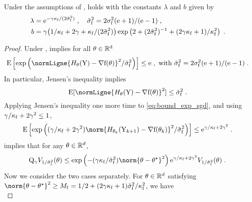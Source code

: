 \begin{lemma}
Under the assumptions of ,  holds with the constants $\lambda$ and $b$ given by 
\begin{equation}
\label{eq:ass_A1_PR_constants}
\begin{split}
\lambda &= \mathrm{e}^{-\gamma\kappa_{\mathrm{f}}/(2\tilde{\sigma}_{\mathrm{f}}^2)}\;, \quad \tilde{\sigma}_{\mathrm{f}}^2 = 2\sigma_{\mathrm{f}}^2(\mathrm{e}+1)/(\mathrm{e}-1)\;, \\
b &= \gamma\bigl(1/\kappa_{\mathrm{f}} + 2 \gamma + \kappa_{\mathrm{f}}/(2\tilde{\sigma}_{\mathrm{f}}^2)\bigr)\exp\left(2 + (2\tilde{\sigma}_{\mathrm{f}}^2)^{-1} + (2\gamma \kappa_{\mathrm{f}}+1)/\kappa_{\mathrm{f}}^2\right)\;.
\end{split}
\end{equation}
\end{lemma}
\begin{proof}
Under ,  implies for all $\theta \in \mathbb{R}^{\mathrm{d}}$
\begin{equation}
  \label{eq:bound_exp_sgd}
  \PE\parentheseDeux{\exp\parenthese{\normLigne{\fieldH_{\theta}(\YSGD) - \nabla \objf(\theta)}^2/\tsgvarfac}}
  \leq \rme \eqsp, \text{ with } \tsgvarfac = 2\sgvarfac(\rme+1)/(\rme-1) \eqsp.
\end{equation}
In particular, Jensen's inequality implies
  \begin{equation}
    \label{eq:bound_var_sgd}
    \PE[\normLigne{\fieldH_{\theta}(\YSGD) - \nabla \objf(\theta)}^2] \leq \tsgvarfac \eqsp.
  \end{equation}
Applying Jensen's inequality one more time to \eqref{eq:bound_exp_sgd}, and using $\gamma/\kappa_{\mathrm{f}} + 2\gamma^2 \leq 1$,
\begin{equation*}
\PE\left[\exp\parenthese{(\gamma / \kapf + 2 \gamma^2) \norm{\fieldH_{\theta_k}(\YSGD_{k+1}) - \nabla \objf(\theta_k)}^2/\tsgvarfac}\right] \leq \rme^{\gamma / \kapf + 2 \gamma^2} \eqsp.
\end{equation*}
 implies that for any $\theta \in \mathbb{R}^d$,
\begin{equation}
\label{eq:Q_gamma_image_bound}
\MKSGD_{\gamma} V_{1/\tsgvarfac}(\theta) \leq \exp\parenthese{-(\gamma \kapf/\tsgvarfac) \norm{\theta - \thetas}^2} \rme^{\gamma / \kapf + 2 \gamma^2} V_{1/\tsgvarfac}(\theta)   \eqsp.
\end{equation}
Now we consider the two cases separately. For $\theta \in\mathbb{R}^d$ satisfying $\norm{\theta-\thetas}^2 \geq M_{\objf} = 1/2 + (2\gamma \kapf+1)\tsgvarfac/\kapf^2$, we have
\begin{equation}
\label{eq:7_drift_sgd_1}

\end{equation}
\end{proof}
